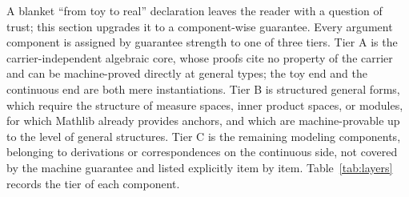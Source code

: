 A blanket ``from toy to real'' declaration leaves the reader with a question of trust; this section upgrades it to a component-wise guarantee. Every argument component is assigned by guarantee strength to one of three tiers. Tier A is the carrier-independent algebraic core, whose proofs cite no property of the carrier and can be machine-proved directly at general types; the toy end and the continuous end are both mere instantiations. Tier B is structured general forms, which require the structure of measure spaces, inner product spaces, or modules, for which Mathlib already provides anchors, and which are machine-provable up to the level of general structures. Tier C is the remaining modeling components, belonging to derivations or correspondences on the continuous side, not covered by the machine guarantee and listed explicitly item by item. Table~\ref{tab:layers} records the tier of each component.

